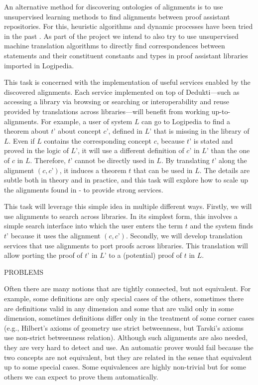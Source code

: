 An alternative method for discovering ontologies of alignments is
to use unsupervised learning methods to find alignments between proof
assistant repositories. For this, heuristic algorithms and dynamic
processes have been tried in the past \cite{???}.  As part of the
project we intend to also try to use unsupervised machine translation
algorithms \cite{???} to directly find correspondences between
statements and their constituent constants and types in proof
assistant libraries imported in Logipedia.

This task is concerned with the implementation of useful services
enabled by the discovered alignments. Each service implemented on top
of Dedukti---such as accessing a library via browsing or searching
or interoperability and reuse provided by translations across
libraries---will benefit from working up-to-alignments. For example, a
user of system $L$ can go to Logipedia to find a theorem about $t’$
about concept $c’$, defined in $L’$ that is missing in the library of
$L$. Even if $L$ contains the corresponding concept $c$, because $t’$
is stated and proved in the logic of $L’$, it will use a
different definition of $c’$ in $L’$ than the one of $c$ in $L$.
Therefore, $t’$ cannot be directly used in $L$. By translating $t’$
along the alignment $(c,c’)$, it induces a theorem $t$ that can be
used in $L$. The details are subtle both in theory and in practice,
and this task will explore how to scale up the alignments found in
- to
provide strong services.

This task will leverage this simple idea in multiple different
ways. Firstly, we will use alignments to search across libraries. In
its simplest form, this involves a simple search interface into which
the user enters the term $t$ and the system finds $t’$ because it uses
the alignment $(c,c’)$. Secondly, we will develop translation services
that use alignments to port proofs across libraries. This translation
will allow porting the proof of $t’$ in $L’$ to a (potential) proof of
$t$ in $L$.


{\color{red} PROBLEMS}

Often there are many notions that are tightly connected, but not
equivalent. For example, some definitions are only special cases of
the others, sometimes there are definitions valid in any dimension and
some that are valid only in some dimension, sometimes definitions
differ only in the treatment of some corner cases (e.g., Hilbert's
axioms of geometry use strict betweenness, but Tarski's axioms use
non-strict betweenness relation). Although such alignments are also
needed, they are very hard to detect and use. An automatic prover
would fail because the two concepts are not equivalent, but they are
related in the sense that equivalent up to some special cases. Some
equivalences are highly non-trivial but for some others we can expect
to prove them automatically.

